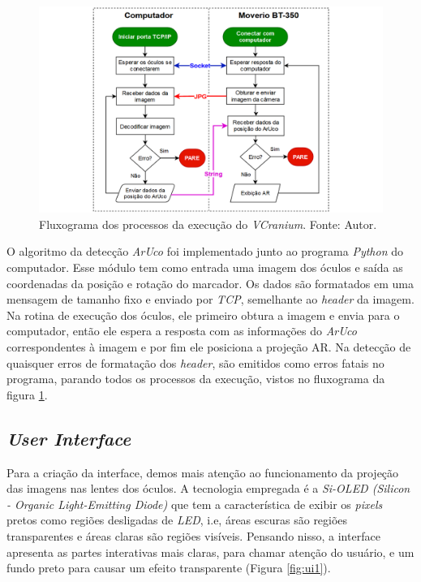 \begin{figure}[ht]
    \centering
    \includegraphics[width=1\linewidth]{figuras/flowchart.png}
    \caption{Fluxograma dos processos da execução do \textit{VCranium}. Fonte: Autor.}
    \label{fig:flowchart}
\end{figure}

\newpage

O algoritmo da detecção \textit{ArUco} foi implementado junto ao programa \textit{Python} do computador. Esse módulo tem como entrada uma imagem dos óculos e saída as coordenadas da posição e rotação do marcador. Os dados são formatados em uma mensagem de tamanho fixo e enviado por \textit{TCP}, semelhante ao \textit{header} da imagem. Na rotina de execução dos óculos, ele primeiro obtura a imagem e envia para o computador, então ele espera a resposta com as informações do \textit{ArUco} correspondentes à imagem e por fim ele posiciona a projeção AR. Na detecção de quaisquer erros de formatação dos \textit{header}, são emitidos como erros fatais no programa, parando todos os processos da execução, vistos no fluxograma da figura \ref{fig:flowchart}.

\subsection{\textit{User Interface}}

Para a criação da interface, demos mais atenção ao funcionamento da projeção das imagens nas lentes dos óculos. A tecnologia empregada é a \textit{Si-OLED (Silicon - Organic Light-Emitting Diode)} que tem a característica de exibir os \textit{pixels} pretos como regiões desligadas de \textit{LED}, i.e, áreas escuras são regiões transparentes e áreas claras são regiões visíveis. Pensando nisso, a interface apresenta as partes interativas mais claras, para chamar atenção do usuário, e um fundo preto para causar um efeito transparente (Figura \ref{fig:ui1}).

